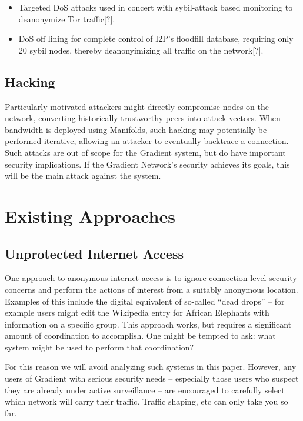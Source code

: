 \documentclass{article}
\begin{document}
\begin{itemize}
    \item Targeted DoS attacks used in concert with sybil-attack based monitoring to deanonymize Tor traffic[?].
    \item DoS off lining for complete control of I2P’s floodfill database, requiring only 20 sybil nodes, thereby deanonyimizing all traffic on the network[?].
\end{itemize}

\subsection{Hacking}

Particularly motivated attackers might directly compromise nodes on the network, converting historically trustworthy peers into attack vectors. When bandwidth is deployed using Manifolds, such hacking may potentially be performed iterative, allowing an attacker to eventually backtrace a connection. Such attacks are out of scope for the Gradient system, but do have important security implications. If the Gradient Network's security achieves its goals, this will be the main attack against the system.

\section{Existing Approaches}
\label{sec:existing-approaches}

\subsection{Unprotected Internet Access}

One approach to anonymous internet access is to ignore connection level security concerns and perform the actions of interest from a suitably anonymous location. Examples of this include the digital equivalent of so-called “dead drops” – for example users might edit the Wikipedia entry for African Elephants with information on a specific group. This approach works, but requires a significant amount of coordination to accomplish. One might be tempted to ask: what system might be used to perform that coordination?

For this reason we will avoid analyzing such systems in this paper. However, any users of Gradient with serious security needs – especially those users who suspect they are already under active surveillance – are encouraged to carefully select which network will carry their traffic. Traffic shaping, etc can only take you so far.
\end{document}
